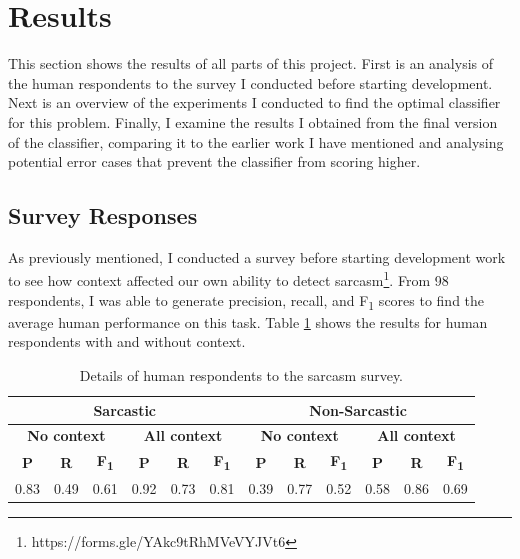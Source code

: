 \documentclass[a4paper,12pt]{article}
\begin{document}
\section{Results}
This section shows the results of all parts of this project. First is an analysis of the human respondents to the survey I conducted before starting development. Next is an overview of the experiments I conducted to find the optimal classifier for this problem. Finally, I examine the results I obtained from the final version of the classifier, comparing it to the earlier work I have mentioned and analysing potential error cases that prevent the classifier from scoring higher.

\subsection{Survey Responses}
As previously mentioned, I conducted a survey before starting development work to see how context affected our own ability to detect sarcasm\footnote{https://forms.gle/YAkc9tRhMVeVYJVt6}. From 98 respondents, I was able to generate precision, recall, and F\textsubscript{1} scores to find the average human performance on this task. Table \ref{tab:cmd2} shows the results for human respondents with and without context.

\begin{table}[h!]
\begin{tabular}{|c|c|c|c|c|c|c|c|c|c|c|c|}
\hline
\multicolumn{6}{|c|}{\textbf{Sarcastic}}                                                                      & \multicolumn{6}{c|}{\textbf{Non-Sarcastic}}                                                                   \\ \hline
\multicolumn{3}{|c|}{\textbf{No context}}             & \multicolumn{3}{c|}{\textbf{All context}}             & \multicolumn{3}{c|}{\textbf{No context}}              & \multicolumn{3}{c|}{\textbf{All context}}             \\ \hline
\textbf{P} & \textbf{R} & \textbf{F\textsubscript{1}} & \textbf{P} & \textbf{R} & \textbf{F\textsubscript{1}} & \textbf{P} & \textbf{R} & \textbf{F\textsubscript{1}} & \textbf{P} & \textbf{R} & \textbf{F\textsubscript{1}} \\ \hline
0.83       & 0.49       & 0.61                        & 0.92       & 0.73       & 0.81                        & 0.39       & 0.77       & 0.52                        & 0.58       & 0.86       & 0.69                        \\ \hline
\end{tabular}
\caption{Details of human respondents to the sarcasm survey.}
\label{tab:cmd2}
\end{table}
\end{document}
